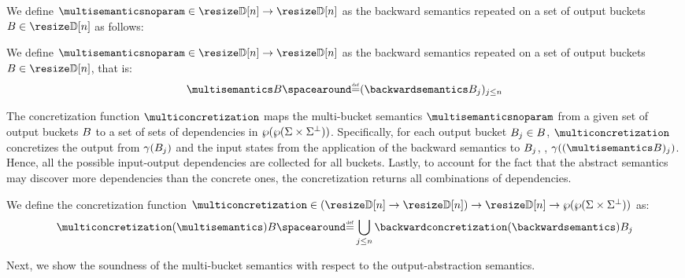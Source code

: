 We define
$\multisemanticsnoparam\in\multitype$ as the backward semantics repeated on a set of output buckets $\buckets\in\vectorbuckets$ as follows:

\begin{definition}
  We define
$\multisemanticsnoparam\in\multitype$ as the backward semantics repeated on a set of output buckets $\buckets\in\vectorbuckets$, that is:
\begin{align*}
\multisemantics\buckets \DefeQ (\backwardsemantics\bucket)_{j\le n}
\end{align*}
\end{definition}


The concretization function $\multiconcretization$ maps the multi-bucket semantics $\multisemanticsnoparam$ from a given set of output buckets $B$ to a set of sets of dependencies in $\wp(\wp(\Sigma\times\Sigma^\bot))$.
Specifically, for each output bucket ${B}_{j}\in B$, $\multiconcretization$ concretizes the output from $\gamma({B}_{j})$ and the input states from the application of the backward semantics to ${B}_{j}$, \ie, $\abstractdomainconcretization((\multisemantics\buckets)_j)$.
Hence, all the possible input-output dependencies are collected for all buckets.
Lastly, to account for the fact that the abstract semantics may discover more dependencies than the concrete ones, the concretization returns all combinations of dependencies.
\begin{definition}
  We define the concretization function $\multiconcretization\in(\multitype)\to\vectorbuckets\to\outputtype$ as:
\begin{gather*}
  \multiconcretization(\multisemantics)\buckets \DefeQ
  \bigsetjoin_{j\le n} \backwardconcretization(\backwardsemantics)\bucket
\end{gather*}
\end{definition}

Next, we show the soundness of the multi-bucket semantics with respect to the output-abstraction semantics.

